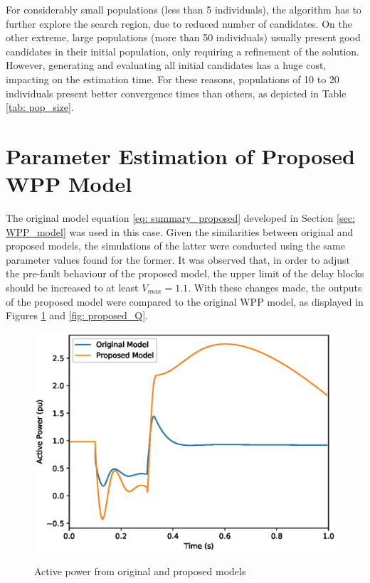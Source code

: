 For considerably small populations (less than 5 individuals), the algorithm has to further explore the search region, due to reduced number of candidates. On the other extreme, large populations (more than 50 individuals) usually present good candidates in their initial population, only requiring a refinement of the solution. However, generating and evaluating all initial candidates has a huge cost, impacting on the estimation time. For these reasons, populations of 10 to 20 individuals present better convergence times than others, as depicted in Table \ref{tab: pop_size}.

\section{Parameter Estimation of Proposed WPP Model}

The original model equation \eqref{eq: summary_proposed} developed in Section \ref{sec: WPP_model} was used in this case. Given the similarities between original and proposed models, the simulations of the latter were conducted using the same parameter values found for the former. It was observed that, in order to adjust the pre-fault behaviour of the proposed model, the upper limit of the delay blocks should be increased to at least $V_{max} = 1.1$. With these changes made, the outputs of the proposed model were compared to the original WPP model, as displayed in Figures \ref{fig: proposed_P} and \ref{fig: proposed_Q}.

\begin{figure}[!h]
	\centering
	\caption{Active power from original and proposed models}
	\includegraphics[scale=.7]{Images/P_proposed.eps}
	\label{fig: proposed_P}
\end{figure}

